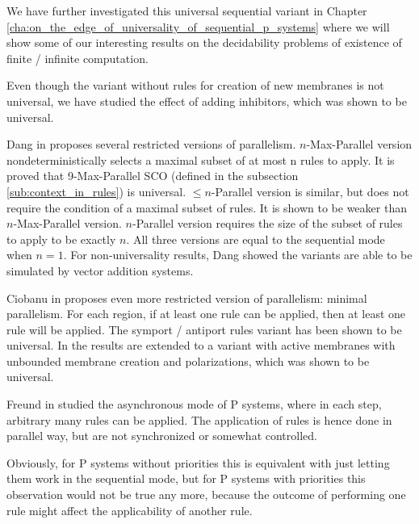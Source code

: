 We have further investigated this universal sequential variant in Chapter \ref{cha:on_the_edge_of_universality_of_sequential_p_systems} where we will show some of our interesting results on the decidability problems of existence of finite / infinite computation.

Even though the variant without rules for creation of new membranes is not universal, we have studied the effect of adding inhibitors, which was shown to be universal.


Dang in \cite{Ibarra04dang} proposes several restricted versions of parallelism.
$n$-Max-Parallel version nondeterministically selects a maximal subset of at most n rules to apply. It is proved that 9-Max-Parallel SCO (defined in the subsection \ref{sub:context_in_rules}) is universal.
$\leq n$-Parallel version is similar, but does not require the condition of a maximal subset of rules. It is shown to be weaker than $n$-Max-Parallel version.
$n$-Parallel version requires the size of the subset of rules to apply to be exactly $n$.
All three versions are equal to the sequential mode when $n=1$. For non-universality results, Dang showed the variants are able to be simulated by vector addition systems.


Ciobanu in \cite{Ciobanu05MinimalParallelism} proposes even more restricted version of parallelism:  minimal parallelism. For each region, if at least one rule can be applied, then at least one rule will be applied. The symport / antiport rules variant has been shown to be universal. In \cite{Ciobanu:2007:MinimalParallelism} the results are extended to a variant with active membranes with unbounded membrane creation and polarizations, which was shown to be universal.


Freund in \cite{Freund:2004:Async} studied the  asynchronous mode of P systems, where in each step, arbitrary many rules can be applied. The application of rules is hence done in parallel way, but are not synchronized or somewhat controlled.

Obviously, for P systems without priorities this is equivalent with just letting them work in the sequential mode, but for P systems with priorities this observation would not be true any more, because the outcome of performing one rule might affect the applicability of another rule.

